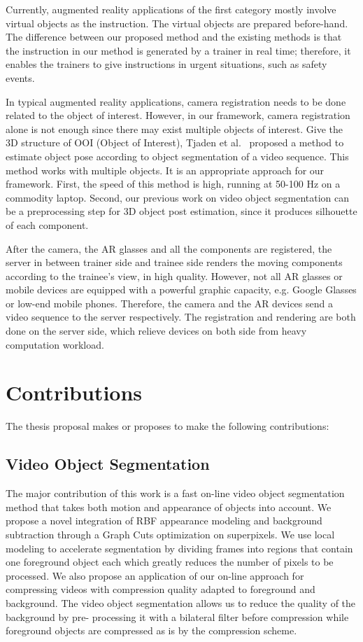 Currently, augmented reality applications of the first category mostly involve virtual objects as the instruction. The virtual objects are prepared before-hand.
The difference between our proposed method and the existing methods is that the instruction in our method is generated by a trainer in real time; therefore, it enables the trainers to give instructions in urgent situations, such as safety events.

In typical augmented reality applications, camera registration needs to be done related to the object of interest. However, in our framework, camera registration alone is not enough since there may exist multiple objects of interest.
Give the 3D structure of OOI (Object of Interest), Tjaden et al.~\cite{tjaden2016} proposed a method to estimate object pose according to object segmentation of a video sequence. This method works with multiple objects.
It is an appropriate approach for our framework. First, the speed of this method is high, running at 50-100 Hz on a commodity laptop. Second, our previous work on video object segmentation can be a preprocessing step for 3D object post estimation, since it produces silhouette of each component.

After the camera, the AR glasses and all the components are registered, the server in between trainer side and trainee side renders the moving components according to the trainee's view, in high quality.
However, not all AR glasses or mobile devices are equipped with a powerful graphic capacity, e.g. Google Glasses or low-end mobile phones.
Therefore, the camera and the AR devices send a video sequence to the server respectively. The registration and rendering are both done on the server side, which relieve devices on both side from heavy computation workload.

\section{Contributions}

The thesis proposal makes or proposes to make the following contributions:

\subsection{Video Object Segmentation}

The major contribution of this work is a fast on-line video object segmentation method that takes both motion and appearance of objects into account. We propose a novel integration of RBF appearance modeling and background subtraction through a Graph Cuts optimization on superpixels. We use local modeling to accelerate segmentation by dividing frames into regions that contain one foreground object each which greatly reduces the number of pixels to be processed. We also propose an application of our on-line approach for compressing videos with compression quality adapted to foreground and background. The video object segmentation allows us to reduce the quality of the background by pre- processing it with a bilateral filter before compression while foreground objects are compressed as is by the compression scheme.

